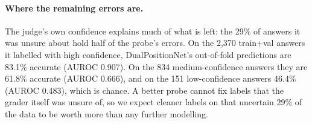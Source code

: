 \documentclass[11pt]{article}
\begin{document}
\begin{table}[t]
  \centering\small
  \caption{Pushing accuracy on v2 (LLM-judge labels). Same folds and splits as Table~\ref{tab:main}; all rows re-run on the GPU machine. CV is one round of grouped 5-fold CV on train+val.}
  \label{tab:push}
\end{table}

\paragraph{Where the remaining errors are.} The judge's own confidence explains much of what is left: the 29\% of answers it was unsure about hold half of the probe's errors. On the 2,370 train+val answers it labelled with high confidence, DualPositionNet's out-of-fold predictions are 83.1\% accurate (AUROC 0.907). On the 834 medium-confidence answers they are 61.8\% accurate (AUROC 0.666), and on the 151 low-confidence answers 46.4\% (AUROC 0.483), which is chance. A better probe cannot fix labels that the grader itself was unsure of, so we expect cleaner labels on that uncertain 29\% of the data to be worth more than any further modelling.
\end{document}
